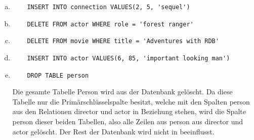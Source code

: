 \documentclass[11pt,a4paper,DIV=9]{scrartcl}
\begin{document}
   \begin{enumerate}[a)]
   \item \begin{lstlisting} 
	INSERT INTO connection VALUES(2, 5, 'sequel') 
   \end{lstlisting}
   
   
   
   
   \item \begin{lstlisting} 
	DELETE FROM actor WHERE role = 'forest ranger'
      \end{lstlisting}
      
   
   

   \item \begin{lstlisting} 
	DELETE FROM movie WHERE title = 'Adventures with RDB'
   \end{lstlisting}
   
   
   

   \item \begin{lstlisting} 
	INSERT INTO actor VALUES(6, 85, 'important looking man')
   \end{lstlisting}
   
   
   

   \item \begin{lstlisting} 
	DROP TABLE person
  \end{lstlisting}
  Die gesamte Tabelle Person wird aus der Datenbank gel\"oscht. 
	Da diese Tabelle nur die Prim\"arschl\"usselspalte besitzt, 
	welche mit den Spalten person aus den Relationen director und actor in Beziehung stehen, 
	wird die Spalte person dieser beiden Tabellen, also alle Zeilen aus person aus director und actor gel\"oscht. 		Der Rest der Datenbank wird nicht in beeinflusst.
 

 \end{enumerate}   
\end{document}
